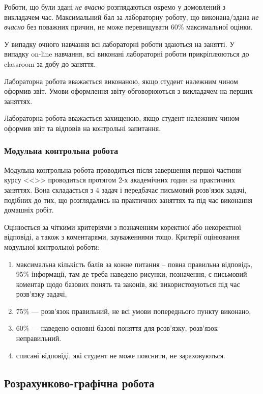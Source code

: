 \documentclass{Syllabus}
\begin{document}
Роботи, що були здані \emph{не вчасно} розглядаються окремо у домовлений з викладачем час. Максимальний бал за лабораторну роботу, що виконана/здана \emph{не вчасно} без поважних причин, не може перевищувати 60\% максимальної оцінки.

У випадку очного навчання всі лабораторні роботи здаються на занятті. У випадку on-line навчання, всі виконані лабораторні роботи прикріплюються до classroom за добу до заняття.

Лабораторна робота вважається виконаною, якщо студент належним чином оформив звіт. Умови оформлення звіту обговорюються з викладачем на перших заняттях.

Лабораторна робота вважається захищеною, якщо студент належним чином оформив звіт та відповів на контрольні запитання.


\subsubsection*{Модульна контрольна робота}


Модульна контрольна робота проводиться після завершення першої частини курсу <<\discipline>> проводиться протягом 2-х академічних годин на практичних заняттях. Вона складається з $4$ задач і передбачає письмовий розв’язок задачі, подібних до тих, що розглядались на практичних заняттях та під час виконання домашніх робіт.

Оцінюється за чіткими критеріями з позначенням коректної або некоректної відповіді, а також з коментарями, зауваженнями тощо. Критерії оцінювання модульної контрольної роботи:
\begin{enumerate}[label=$\bullet$]
	\item максимальна кількість балів за кожне питання – повна правильна відповідь, 95\% інформації, там де треба наведено рисунки, позначення, є письмовий коментар щодо базових понять та законів, які використовуються під час розв’язку задачі,
	\item 75\%  --- розв’язок правильний, не всі умови попереднього пункту виконано,
	\item 60\%  --- наведено основні базові поняття для розв’язку, розв’язок неправильний.
	\item списані відповіді, які студент не може пояснити, не зараховуються.
\end{enumerate}


\subsection*{Розрахунково-графічна робота}
\end{document}
